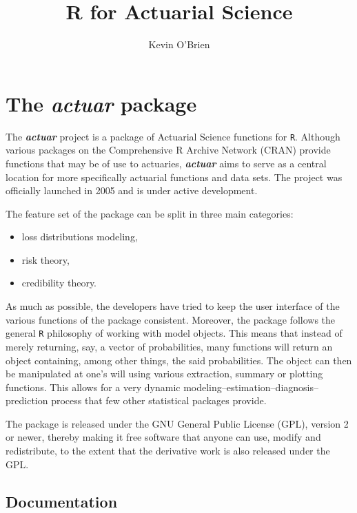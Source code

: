 \documentclass[12pt]{article}
\title{R for Actuarial Science}
\author{Kevin O'Brien}
\begin{document}
\maketitle

\section{The \textit{actuar} package}
The \textbf{\textit{actuar}} project is a package of Actuarial Science functions for \texttt{R}. Although various packages on the Comprehensive R Archive Network (CRAN) provide functions that may be of use to actuaries, \textbf{\textit{actuar}} aims to serve as a central location for more specifically actuarial functions and data sets. The project was officially launched in 2005 and is under active development.

The feature set of the package can be split in three main categories: 
\begin{itemize}
\item loss distributions modeling,
\item risk theory,
\item credibility theory.
\end{itemize}

As much as possible, the developers have tried to keep the user interface of the various functions of the package consistent. Moreover, the package follows the general \texttt{R} philosophy of working with model objects. This means that instead of merely returning, say, a vector of probabilities, many functions will return an object containing, among other things, the said probabilities. The object can then be manipulated at one's will using various extraction, summary or plotting functions. This allows for a very dynamic modeling–estimation–diagnosis–prediction process that few other statistical packages provide.

The package is released under the GNU General Public License (GPL), version 2 or newer, thereby making it free software that anyone can use, modify and redistribute, to the extent that the derivative work is also released under the GPL.

\subsection{Documentation}
\end{document}
